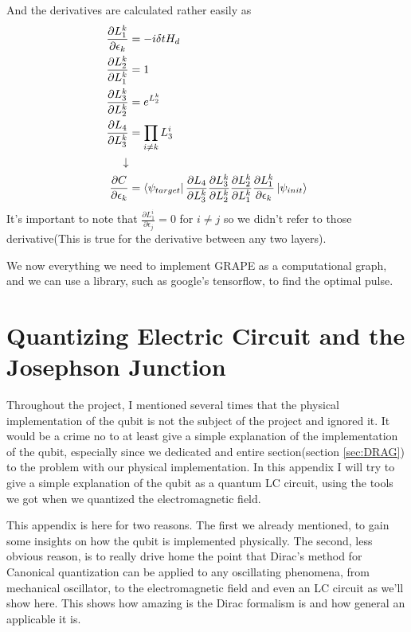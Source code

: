 \documentclass[english, a4paper, 12pt, twoside]{article}
\numberwithin{equation}{section} %
\begin{document}
And the derivatives are calculated rather easily as
\begin{align*}
    \frac{\partial L_1^k}{\partial \epsilon_k} &= -i \delta t H_d\\
    \frac{\partial L_2^k}{\partial L_1^k} &= 1 \\
    \frac{\partial L_3^k}{\partial L_2^k} &= e^{L_2^k} \\
    \frac{\partial L_4}{\partial L_3^k} &= \prod_{i \ne k} L_3^i \\
    \downarrow \\
    \frac{\partial C}{\partial \epsilon_k} &= \bra{\psi_{target}}  \frac{\partial L_4}{\partial L_3^k}  \frac{\partial L_3^k}{\partial L_2^k} \frac{\partial L_2^k}{\partial L_1^k}  \frac{\partial L_1^k}{\partial \epsilon_k} \ket{\psi_{init}}
\end{align*}
It's important to note that $\frac{\partial L_1^i}{\partial \epsilon_j} = 0$ for $i \ne j$ so we didn't refer to those derivative(This is true for the derivative between any two layers).

We now everything we need to implement GRAPE as a computational graph, and we can use a library, such as google's tensorflow, to find the optimal pulse.

\newpage
\section{Quantizing Electric Circuit and the Josephson Junction} \label{appen:LC}
Throughout the project, I mentioned several times that the physical implementation of the qubit is not  the subject of the project and ignored it. It would be a crime no to at least give a simple explanation of the implementation of the qubit, especially since we dedicated and entire section(section \ref{sec:DRAG}) to the problem with our physical implementation. In this appendix I will try to give a simple explanation of  the qubit as a quantum LC circuit, using the  tools we got when we quantized the electromagnetic field.

This appendix is here for two reasons. The first we already mentioned, to gain some insights on how the qubit is implemented physically. The second, less obvious reason, is to really drive home the point that Dirac's method for Canonical quantization can be applied to any oscillating phenomena, from mechanical oscillator, to the electromagnetic field and even an LC circuit as we'll show here. This shows how amazing is the Dirac formalism is and how general an applicable it is.
\end{document}
